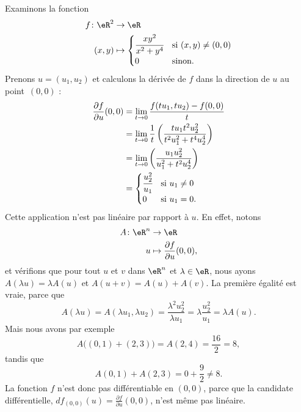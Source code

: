 \begin{example}     \label{Exemple0046Diff}
	Examinons la fonction
	\begin{equation}
		\begin{aligned}
			f\colon \eR^2 & \to \eR                                                       \\
			(x,y)         & \mapsto \begin{cases}
				                        \cfrac{ xy^2 }{ x^2+y^4 } & \text{si }(x,y)\neq (0,0) \\
				                        0                         & \text{sinon}.
			                        \end{cases}
		\end{aligned}
	\end{equation}
	Prenons \( u=(u_1,u_2)\) et calculons la dérivée de \( f\) dans la direction de \( u\) au point~\( (0,0)\) :
	\begin{equation}
		\begin{aligned}[]
			\frac{ \partial f }{ \partial u }(0,0)
			 & =\lim_{t\to 0}\frac{ f(tu_1,tu_2)-f(0,0) }{ t }                                      \\
			 & =\lim_{t\to 0}\frac{1}{ t }\left( \frac{ tu_1t^2u_2^2 }{ t^2u_1^2+t^4u_2^4 } \right) \\
			 & =\lim_{t\to 0}\left( \frac{ u_1u_2^2 }{ u_1^2+t^2u_2^4 } \right)                     \\
			 & =\begin{cases}
				    \cfrac{ u_2^2 }{ u_1 } & \text{si }u_1\neq 0 \\
				    0                      & \text{si }u_1=0.
			    \end{cases}
		\end{aligned}
	\end{equation}
	Cette application n'est pas linéaire par rapport à \( u\). En effet, notons
	\begin{equation}
		\begin{aligned}
			A\colon \eR^n & \to \eR                                         \\
			u             & \mapsto \frac{ \partial f }{ \partial u }(0,0),
		\end{aligned}
	\end{equation}
	et vérifions que pour tout \( u\) et \( v\) dans \( \eR^n\) et \( \lambda\in\eR\), nous ayons \( A(\lambda u)=\lambda A(u)\) et \( A(u+v)=A(u)+A(v)\). La première égalité est vraie, parce que
	\begin{equation}
		A(\lambda u)=A(\lambda u_1,\lambda u_2)=\frac{ \lambda^2 u_2^2 }{ \lambda u_1 }=\lambda\frac{ u_2^2 }{ u_1 }=\lambda A(u).
	\end{equation}
	Mais nous avons par exemple
	\begin{equation}
		A\big( (0,1)+(2,3) \big)=A(2,4)=\frac{ 16 }{ 2 }=8,
	\end{equation}
	tandis que
	\begin{equation}
		A(0,1)+A(2,3)=0+\frac{ 9 }{ 2 }\neq 8.
	\end{equation}
	La fonction \( f\) n'est donc pas différentiable en \( (0,0)\), parce que la candidate différentielle, \( df_{(0,0)}(u)=\frac{ \partial f }{ \partial u }(0,0)\), n'est même pas linéaire.


\end{example}

